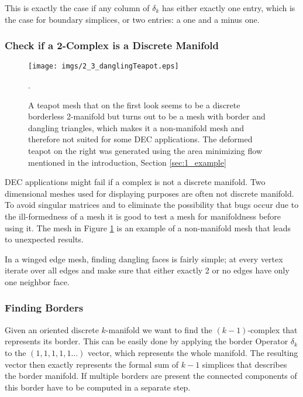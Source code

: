 This is exactly the case if any column of $\delta_k$ has either exactly one entry, which is the case for boundary simplices, or two entries: a one and a minus one. 

\subsubsection{Check if a 2-Complex is a Discrete Manifold}
\begin{figure}[tb]
	\begin{center}
	\texttt{[image: imgs/2\_3\_danglingTeapot.eps]}
	\end{center}
	\caption{A teapot mesh that on the first look seems to be a discrete borderless 2-manifold but turns out to be a mesh with border and dangling triangles, which makes it a non-manifold mesh and therefore not suited for some DEC applications. The deformed teapot on the right was generated using the area minimizing flow mentioned in the introduction, Section \ref{sec:1_example}}.
	\label{fig:2_badteapot}
\end{figure}

DEC applications might fail if a complex is not a discrete manifold. Two dimensional meshes used for displaying purposes are often not discrete manifold. To avoid singular matrices and to eliminate the possibility that bugs occur due to the ill-formedness of a mesh it is good to test a mesh for manifoldness before using it. The mesh in Figure \ref{fig:2_badteapot} is an example of a non-manifold mesh that leads to unexpected results.

In a winged edge mesh, finding dangling faces is fairly simple; at every vertex iterate over all edges and make sure that either exactly 2 or no edges have only one neighbor face.
	
\subsubsection{Finding Borders}
Given an oriented discrete $k$-manifold we want to find the $(k-1)$-complex that represents its border. This can be easily done by applying the border Operator $\delta_k$ to the $(1,1,1,1,1...)$ vector, which represents the whole manifold. The resulting vector then exactly represents the formal sum of $k-1$ simplices that describes the border manifold. If multiple borders are present the connected components of this border have to be computed in a separate step.
